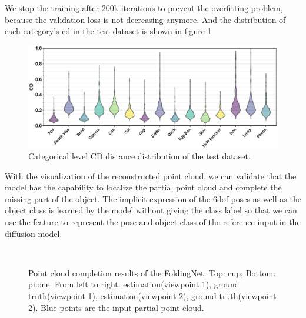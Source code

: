 \documentclass[12pt,DIV14,BCOR12mm,a4paper,footinclude=false,headinclude,parskip=half-,twoside,openright,cleardoublepage=empty,toc=index,bibliography=totoc,listof=totoc]{scrreprt}
\numberwithin{equation}{chapter}
\begin{document}
We stop the training after 200k iterations to prevent the overfitting problem, because the validation loss is not decreasing anymore. And the distribution of each category's \gls{cd} in the test dataset is shown in figure \ref{img:cd_cate} 

\begin{figure}[h]
	\centering
	\includegraphics[width=1.\textwidth]{img/cd_category.eps}
	\caption{Categorical level CD distance distribution of the test dataset.}
	\label{img:cd_cate}
\end{figure}



With the visualization of the reconstructed point cloud, we can validate that the model has the capability to localize the partial point cloud and complete the missing part of the object. The implicit expression of the \gls{6dof} poses as well as the object class is learned by the model without giving the class label so that we can use the feature to represent the pose and object class of the reference input in the diffusion model.

\begin{figure}[h]
	\centering
	\\
  \centering
	\caption{Point cloud completion results of the FoldingNet. Top: cup; Bottom: phone. From left to right: estimation(viewpoint 1), ground truth(viewpoint 1), estimation(viewpoint 2), ground truth(viewpoint 2). Blue points are the input partial point cloud.}
	\label{img:comp_all}
\end{figure}
\end{document}
